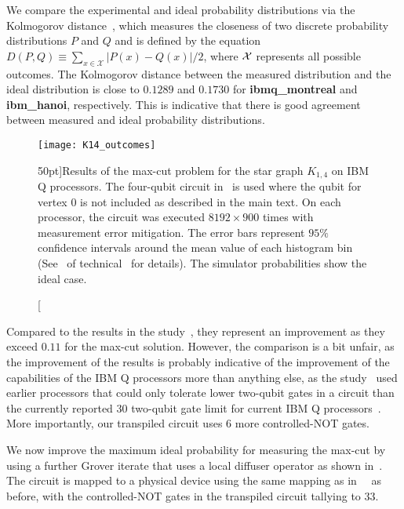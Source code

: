 \bigskip
\noindent
We compare the experimental and ideal probability distributions via the Kolmogorov distance~\cite{Mike&Ike}, which measures the closeness of two discrete probability distributions $P$ and $Q$ and is defined by the equation $D(P,Q) \equiv \sum_{x \in \mathcal{X}}|P(x) - Q(x)|/2$, where ${\cal X}$ represents all possible outcomes. The Kolmogorov distance between the measured distribution and the ideal distribution is close to $0.1289$ and $0.1730$ for \textbf{ibmq\_montreal} and \textbf{ibm\_hanoi}, respectively. This is indicative that there is good agreement between measured and ideal probability distributions. 

\begin{figure}[b!]
    \centering
    \texttt{[image: K14\_outcomes]}
    \caption[Results of the \acs{max-cut} problem for the star graph $K_{1,4}$ on IBM Q processors.][50pt]{Results of the \acs{max-cut} problem for the star graph $K_{1,4}$ on IBM Q processors. The four-qubit circuit in~\protect{} is used where the qubit for vertex $0$ is not included as described in the main text. On each processor, the circuit was executed ${8192 \times 900}$ times with measurement error mitigation. The error bars represent ${95\%}$ confidence intervals around the mean value of each histogram bin (See~\protect{} of technical~\protect{} for details). The simulator probabilities show the ideal case.}
\end{figure}

\clearpage
\noindent
Compared to the results in the study~\cite{Satoh_2020}, they represent an improvement as they exceed $0.11$ for the \acs{max-cut} solution. However, the comparison is a bit unfair, as the improvement of the results is probably indicative of the improvement of the capabilities of the IBM Q processors more than anything else, as the study~\cite{Satoh_2020} used earlier processors that could only tolerate lower two-qubit gates in a circuit than the currently reported $30$ two-qubit gate limit for current IBM Q processors~\cite{Gwinner_2020,Zhang_2021}. More importantly, our transpiled circuit uses $6$ more controlled-NOT gates. 

\bigskip
\noindent
We now improve the maximum ideal probability for measuring the \acs{max-cut} by using a further Grover iterate that uses a local diffuser operator as shown in~. The circuit is mapped to a physical device using the same mapping as in~~ as before, with the controlled-NOT gates in the transpiled circuit tallying to $33$. 

